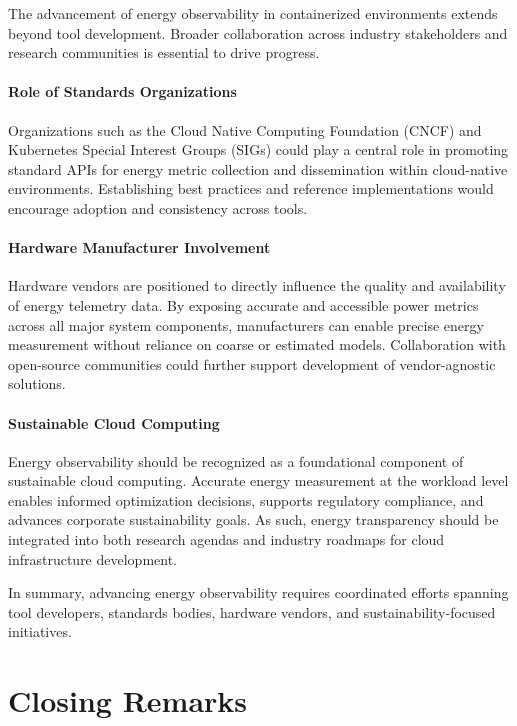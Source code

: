 The advancement of energy observability in containerized environments extends beyond tool development. Broader collaboration across industry stakeholders and research communities is essential to drive progress.

\paragraph{Role of Standards Organizations}
Organizations such as the Cloud Native Computing Foundation (CNCF) and Kubernetes Special Interest Groups (SIGs) could play a central role in promoting standard APIs for energy metric collection and dissemination within cloud-native environments. Establishing best practices and reference implementations would encourage adoption and consistency across tools.

\paragraph{Hardware Manufacturer Involvement}
Hardware vendors are positioned to directly influence the quality and availability of energy telemetry data. By exposing accurate and accessible power metrics across all major system components, manufacturers can enable precise energy measurement without reliance on coarse or estimated models. Collaboration with open-source communities could further support development of vendor-agnostic solutions.

\paragraph{Sustainable Cloud Computing}
Energy observability should be recognized as a foundational component of sustainable cloud computing. Accurate energy measurement at the workload level enables informed optimization decisions, supports regulatory compliance, and advances corporate sustainability goals. As such, energy transparency should be integrated into both research agendas and industry roadmaps for cloud infrastructure development.

In summary, advancing energy observability requires coordinated efforts spanning tool developers, standards bodies, hardware vendors, and sustainability-focused initiatives.

\section{Closing Remarks}
\label{sec:future-conclusion}

